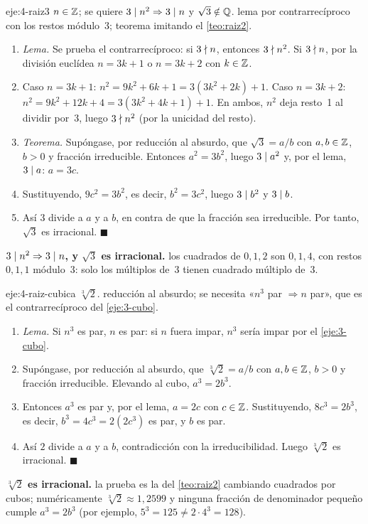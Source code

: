 \begin{solucion}{eje:4-raiz3}
\datos $n\in\mathbb{Z}$; se quiere $3\mid n^{2}\Rightarrow 3\mid n$ y $\sqrt3\notin\mathbb{Q}$.
\planteamiento lema por contrarrecíproco con los restos módulo~3; teorema imitando el \cref{teo:raiz2}.
\pasos
\begin{enumerate}[label=\arabic*.]
  \item \emph{Lema.} Se prueba el contrarrecíproco: si $3\nmid n$, entonces $3\nmid n^{2}$. Si $3\nmid n$, por la división euclídea $n=3k+1$ o $n=3k+2$ con $k\in\mathbb{Z}$.
  \item Caso $n=3k+1$: $n^{2}=9k^{2}+6k+1=3(3k^{2}+2k)+1$. Caso $n=3k+2$: $n^{2}=9k^{2}+12k+4=3(3k^{2}+4k+1)+1$. En ambos, $n^{2}$ deja resto~1 al dividir por~3, luego $3\nmid n^{2}$ (por la unicidad del resto).
  \item \emph{Teorema.} Supóngase, por reducción al absurdo, que $\sqrt3=a/b$ con $a,b\in\mathbb{Z}$, $b>0$ y fracción irreducible. Entonces $a^{2}=3b^{2}$, luego $3\mid a^{2}$ y, por el lema, $3\mid a$: $a=3c$.
  \item Sustituyendo, $9c^{2}=3b^{2}$, es decir, $b^{2}=3c^{2}$, luego $3\mid b^{2}$ y $3\mid b$.
  \item Así $3$ divide a $a$ y a $b$, en contra de que la fracción sea irreducible. Por tanto, $\sqrt3$ es irracional. $\blacksquare$
\end{enumerate}
\resultado \textbf{$3\mid n^{2}\Rightarrow 3\mid n$, y $\sqrt3$ es irracional.}
\comprobacion los cuadrados de $0,1,2$ son $0,1,4$, con restos $0,1,1$ módulo~3: solo los múltiplos de~3 tienen cuadrado múltiplo de~3.
\end{solucion}

\begin{solucion}{eje:4-raiz-cubica}
\datos $\sqrt[3]{2}$.
\planteamiento reducción al absurdo; se necesita «$n^{3}$ par $\Rightarrow n$ par», que es el contrarrecíproco del \cref{eje:3-cubo}.
\pasos
\begin{enumerate}[label=\arabic*.]
  \item \emph{Lema.} Si $n^{3}$ es par, $n$ es par: si $n$ fuera impar, $n^{3}$ sería impar por el \cref{eje:3-cubo}.
  \item Supóngase, por reducción al absurdo, que $\sqrt[3]{2}=a/b$ con $a,b\in\mathbb{Z}$, $b>0$ y fracción irreducible. Elevando al cubo, $a^{3}=2b^{3}$.
  \item Entonces $a^{3}$ es par y, por el lema, $a=2c$ con $c\in\mathbb{Z}$. Sustituyendo, $8c^{3}=2b^{3}$, es decir, $b^{3}=4c^{3}=2(2c^{3})$ es par, y $b$ es par.
  \item Así $2$ divide a $a$ y a $b$, contradicción con la irreducibilidad. Luego $\sqrt[3]{2}$ es irracional. $\blacksquare$
\end{enumerate}
\resultado \textbf{$\sqrt[3]{2}$ es irracional.}
\comprobacion la prueba es la del \cref{teo:raiz2} cambiando cuadrados por cubos; numéricamente $\sqrt[3]2\approx 1{,}2599$ y ninguna fracción de denominador pequeño cumple $a^{3}=2b^{3}$ (por ejemplo, $5^{3}=125\neq 2\cdot 4^{3}=128$).
\end{solucion}

